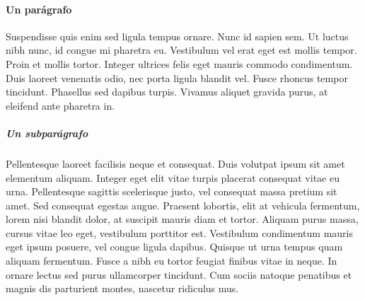 \paragraph{Un parágrafo}Suspendisse quis enim sed ligula tempus ornare. Nunc id sapien sem. Ut luctus nibh nunc, id congue mi pharetra eu. Vestibulum vel erat eget est mollis tempor. Proin et mollis tortor. Integer ultrices felis eget mauris commodo condimentum. Duis laoreet venenatis odio, nec porta ligula blandit vel. Fusce rhoncus tempor tincidunt. Phasellus sed dapibus turpis. Vivamus aliquet gravida purus, at eleifend ante pharetra in.

\subparagraph{Un subparágrafo}Pellentesque laoreet facilisis neque et consequat. Duis volutpat ipsum sit amet elementum aliquam. Integer eget elit vitae turpis placerat consequat vitae eu urna. Pellentesque sagittis scelerisque justo, vel consequat massa pretium sit amet. Sed consequat egestas augue. Praesent lobortis, elit at vehicula fermentum, lorem nisi blandit dolor, at suscipit mauris diam et tortor. Aliquam purus massa, cursus vitae leo eget, vestibulum porttitor est. Vestibulum condimentum mauris eget ipsum posuere, vel congue ligula dapibus. Quisque ut urna tempus quam aliquam fermentum. Fusce a nibh eu tortor feugiat finibus vitae in neque. In ornare lectus sed purus ullamcorper tincidunt. Cum sociis natoque penatibus et magnis dis parturient montes, nascetur ridiculus mus.
